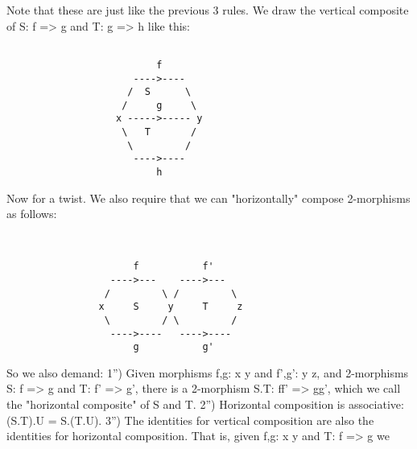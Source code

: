 Note that these are just like the previous 3 rules.  We draw the vertical
composite of S: f => g and T: g => h like this:


\begin{verbatim}

                          f
                      ---->----
                     /  S      \
                    /     g     \
                   x ----->----- y
                    \   T       /
                     \         /
                      ---->----
                          h

\end{verbatim}
    
Now for a twist.  We also require that we can "horizontally" compose
2-morphisms as follows:

\begin{verbatim}

 
                      f           f'
                  ---->---    ---->---
                 /         \ /         \
                x     S     y     T     z
                 \         / \         /
                  ---->----   ---->----
                      g           g'

\end{verbatim}
    
So we also demand:
1'') Given morphisms f,g: x \to  y and f',g': y \to  z, and 2-morphisms
S: f => g and T: f' => g', there is a 2-morphism S.T: ff' => gg', which we
call the "horizontal composite" of S and T.
2'') Horizontal composition is associative:  (S.T).U = S.(T.U).
3'') The identities for vertical composition are also the identities for
horizontal composition.  That is, given f,g: x \to  y and T: f => g we


